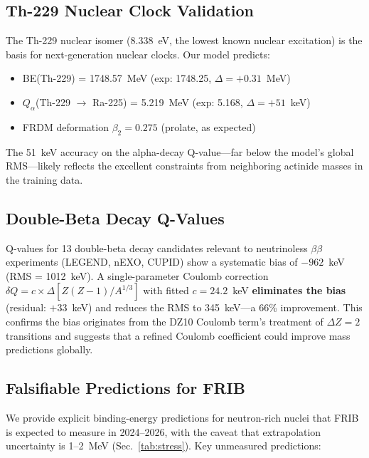 \documentclass[twocolumn,letterpaper,10pt]{article}
\begin{document}
\subsection{Th-229 Nuclear Clock Validation}

The Th-229 nuclear isomer (8.338~eV, the lowest known nuclear excitation)
is the basis for next-generation nuclear clocks. Our model predicts:
\begin{itemize}
\item BE(Th-229) = 1748.57~MeV (exp: 1748.25, $\Delta = +0.31$~MeV)
\item $Q_\alpha$(Th-229 $\to$ Ra-225) = 5.219~MeV (exp: 5.168,
      $\Delta = +51$~keV)
\item FRDM deformation $\beta_2 = 0.275$ (prolate, as expected)
\end{itemize}
The 51~keV accuracy on the alpha-decay Q-value---far below the model's
global RMS---likely reflects the excellent constraints from neighboring
actinide masses in the training data.

\subsection{Double-Beta Decay Q-Values}

Q-values for 13 double-beta decay candidates relevant to neutrinoless
$\beta\beta$ experiments (LEGEND, nEXO, CUPID) show a systematic bias of
$-962$~keV (RMS = 1012~keV). A single-parameter Coulomb correction
$\delta Q = c \times \Delta[Z(Z{-}1)/A^{1/3}]$ with fitted $c = 24.2$~keV
\textbf{eliminates the bias} (residual: $+33$~keV) and reduces the RMS to
345~keV---a 66\% improvement. This confirms the bias originates from the
DZ10 Coulomb term's treatment of $\Delta Z = 2$ transitions and suggests
that a refined Coulomb coefficient could improve mass predictions globally.

\subsection{Falsifiable Predictions for FRIB}

We provide explicit binding-energy predictions for neutron-rich nuclei
that FRIB is expected to measure in 2024--2026, with the caveat that
extrapolation uncertainty is 1--2~MeV (Sec.~\ref{tab:stress}). Key
unmeasured predictions:
\end{document}
